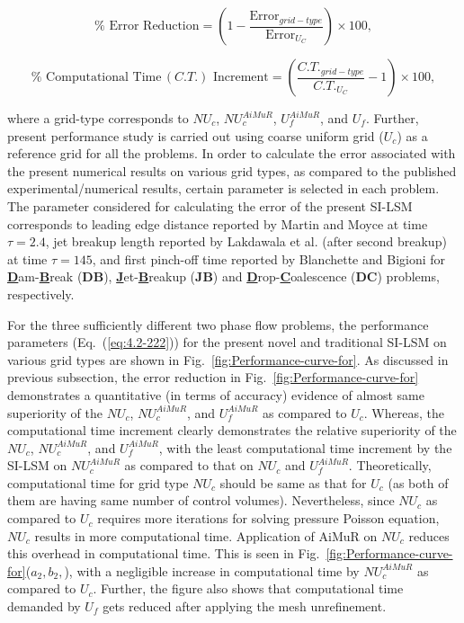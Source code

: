 \documentclass[preprint,12pt]{elsarticle}
\begin{document}
\[
\%\,\, \text{Error}\,\, \text{Reduction}=\left(1-\frac{\text{Error}_{grid-type}}{\text{Error}_{U_{C}}}\right)\times100,
\]

\begin{equation}
\%\,\, \text{Computational}\,\, \text{Time}\,(C.T.)\,\, \text{Increment}=\left(\frac{C.T.{}_{grid-type}}{C.T.{}_{U_{C}}}-1\right)\times100,
\label{eq:4.2-222}
\end{equation}


where a grid-type corresponds to $NU_{c}$, $NU_{c}^{AiMuR}$,
$U_{f}^{AiMuR}$, and $U_{f}$. Further, present performance study is carried
out using coarse uniform grid ($U_{c}$) as a reference grid for all
the problems. In order to calculate the error associated with the present numerical
results on various grid types, as compared to the published experimental/numerical results, certain parameter is selected
in each problem.
The parameter considered for calculating the error of the present SI-LSM corresponds to leading edge distance reported by
Martin and Moyce \cite{martin1952} at time $\tau=2.4$, jet breakup length reported by Lakdawala et al. \cite{lakdawala2014} (after second
breakup) at time $\tau=145$, and first pinch-off time reported by Blanchette
and Bigioni \cite{blanchette2006} for\textbf{ }\textbf{\underline{D}}am-\textbf{\underline{B}}reak (\textbf{DB}),
\textbf{\underline{J}}et-\textbf{\underline{B}}reakup (\textbf{JB})
and \textbf{\underline{D}}rop-\textbf{\underline{C}}oalescence (\textbf{DC})
problems, respectively. 

For the three sufficiently different two phase flow problems, the performance parameters (Eq.~(\ref{eq:4.2-222})) for the present novel and traditional SI-LSM on various grid types are shown in Fig.~\ref{fig:Performance-curve-for}.
As discussed in previous subsection, the error reduction in Fig.~\ref{fig:Performance-curve-for} demonstrates a quantitative (in terms of accuracy) evidence of almost same superiority of the $NU_{c}$, $NU_{c}^{AiMuR}$,
and $U_{f}^{AiMuR}$ as compared to $U_{c}$. Whereas, the computational time increment clearly demonstrates the relative superiority of the $NU_{c}$, $NU_{c}^{AiMuR}$,
and $U_{f}^{AiMuR}$, with the least computational time increment by the SI-LSM on $NU_{c}^{AiMuR}$ as compared to that on $NU_{c}$ and $U_{f}^{AiMuR}$. Theoretically,
computational time for grid type $NU_{c}$ should be same as that
for $U_{c}$ (as both of them are having same number of control volumes).
Nevertheless, since $NU_{c}$ as compared to $U_{c}$ requires more iterations
for solving pressure Poisson equation, $NU_{c}$ results in more computational
time. Application of AiMuR on $NU_{c}$ reduces this overhead
in computational time. This is seen in Fig.~\ref{fig:Performance-curve-for}($a_{2},b_{2},$), with a negligible increase in computational time by $NU_{c}^{AiMuR}$ as compared to $U_{c}$. Further, the figure also shows that computational time demanded by $U_{f}$ gets reduced after applying the mesh unrefinement.
\end{document}

